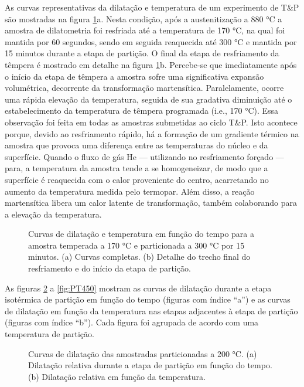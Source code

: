 As curvas representativas da dilatação e temperatura de um experimento de T\&P são mostradas na figura \ref{fig:TP170-300}a. Nesta condição, após a austenitização a 880 °C a amostra de dilatometria foi resfriada até a temperatura de 170 °C, na qual foi mantida por 60 segundos, sendo em seguida reaquecida até 300 °C e mantida por 15 minutos durante a etapa de partição. O final da etapa de resfriamento da têmpera é mostrado em detalhe na figura \ref{fig:TP170-300}b. Percebe-se que imediatamente após o início da etapa de têmpera a amostra sofre uma significativa expansão volumétrica, decorrente da transformação martensítica. Paralelamente, ocorre uma rápida elevação da temperatura, seguida de sua gradativa diminuição até o estabelecimento da temperatura de têmpera programada (i.e., 170 °C). Essa observação foi feita em todas as amostras submetidas ao ciclo T\&P. Isto acontece porque, devido ao resfriamento rápido, há a formação de um gradiente térmico na amostra que provoca uma diferença entre as temperaturas do núcleo e da superfície. Quando o fluxo de gás He --- utilizando no resfriamento forçado --- para, a temperatura da amostra tende a se homogeneizar, de modo que a superfície é reaquecida com o calor proveniente do centro, acarretando no aumento da temperatura medida pelo termopar. Além disso, a reação martensítica libera um calor latente de transformação, também colaborando para a elevação da temperatura.

\begin{figure}
	\vspace{0pt}
	\caption{Curvas de dilatação e temperatura em função do tempo para a amostra temperada a 170 °C e particionada a 300 °C por 15 minutos. (a) Curvas completas. (b) Detalhe do trecho final do resfriamento e do início da etapa de partição.}
	\label{fig:TP170-300}
\end{figure}

As figuras \ref{fig:PT200} a \ref{fig:PT450} mostram as curvas de dilatação durante a etapa isotérmica de partição em função do tempo (figuras com índice ``a'') e as curvas de dilatação em função da temperatura nas etapas adjacentes à etapa de partição (figuras com índice ``b''). Cada figura foi agrupada de acordo com uma temperatura de partição.

\begin{figure}
	\quad
	\caption{Curvas de dilatação das amostradas particionadas a 200 °C. (a) Dilatação relativa durante a etapa de partição em função do tempo. (b) Dilatação relativa em função da temperatura.}
	\label{fig:PT200}
\end{figure}

